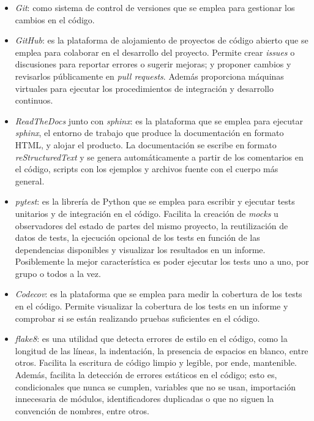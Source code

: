 \begin{itemize}
    \item \textit{Git}: como sistema de control de versiones que se emplea para gestionar los cambios en el código.
    \item \textit{GitHub}: es la plataforma de alojamiento de proyectos de código abierto que se emplea para colaborar en el desarrollo del proyecto. Permite crear \textit{issues} o discusiones para reportar errores o sugerir mejoras; y proponer cambios y revisarlos públicamente en \textit{pull requests}. Además proporciona máquinas virtuales para ejecutar los procedimientos de integración y desarrollo continuos.
    \item \textit{ReadTheDocs} junto con \textit{sphinx}: es la plataforma que se emplea para ejecutar \textit{sphinx}, el entorno de trabajo que produce la documentación en formato HTML, y alojar el producto. La documentación se escribe en formato \textit{reStructuredText} y se genera automáticamente a partir de los comentarios en el código, scripts con los ejemplos y archivos fuente con el cuerpo más general.
    \item \textit{pytest}: es la librería de Python que se emplea para escribir y ejecutar tests unitarios y de integración en el código. Facilita la creación de \textit{mocks} u observadores del estado de partes del mismo proyecto, la reutilización de datos de tests, la ejecución opcional de los tests en función de las dependencias disponibles y visualizar los resultados en un informe. Posiblemente la mejor característica es poder ejecutar los tests uno a uno, por grupo o todos a la vez.
    \item \textit{Codecov}: es la plataforma que se emplea para medir la cobertura de los tests en el código. Permite visualizar la cobertura de los tests en un informe y comprobar si se están realizando pruebas suficientes en el código.
    \item \textit{flake8}: es una utilidad que detecta errores de estilo en el código, como la longitud de las líneas, la indentación, la presencia de espacios en blanco, entre otros. Facilita la escritura de código limpio y legible, por ende, mantenible.
          Además, facilita la detección de errores estáticos en el código; esto es, condicionales que nunca se cumplen, variables que no se usan, importación innecesaria de módulos, identificadores duplicadas o que no siguen la convención de nombres, entre otros.

\end{itemize}

